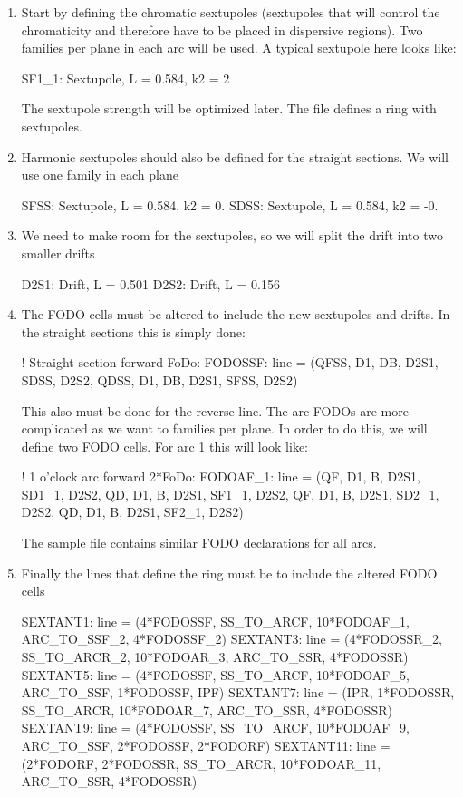 \documentclass{hitec}     %
\begin{document}
{{{{\begin{enumerate}[leftmargin=*]
%
\item Start by defining the chromatic sextupoles (sextupoles that will control the chromaticity and therefore have to be placed in dispersive regions). 
Two families per plane in each arc will be used. A typical sextupole here looks like:
\begin{code}
SF1_1: Sextupole, L = 0.584, k2 = 2
\end{code}
The sextupole strength will be optimized later. The  file defines a ring with sextupoles.
\item Harmonic sextupoles should also be defined for the straight sections. We will use one family in each plane
\begin{code}
SFSS: Sextupole, L = 0.584, k2 = 0.
SDSS: Sextupole, L = 0.584, k2 = -0.   
\end{code}
\item We need to make room for the sextupoles, so we will split the drift  into two smaller drifts
\begin{code}
D2S1: Drift, L = 0.501
D2S2: Drift, L = 0.156
\end{code}
\item The FODO cells must be altered to include the new sextupoles and drifts. In the straight sections this is simply done:
\begin{code}
! Straight section forward FoDo:
FODOSSF: line = (QFSS, D1, DB, D2S1, SDSS, D2S2, 
                 QDSS, D1, DB, D2S1, SFSS, D2S2)
\end{code}
This also must be done for the reverse line.
The arc FODOs are more  complicated as we want to families per plane. In order to do this, we will define two FODO cells. For arc 1 this will look like:
\begin{code}
! 1 o'clock arc forward 2*FoDo:
FODOAF_1: line = (QF, D1, B, D2S1, SD1_1, D2S2, 
                  QD, D1, B, D2S1, SF1_1, D2S2,
                  QF, D1, B, D2S1, SD2_1, D2S2, 
                  QD, D1, B, D2S1, SF2_1, D2S2)

\end{code}
The sample file contains similar FODO declarations for all arcs.
\item Finally the lines that define the ring must be to include the altered FODO cells
\begin{code}
SEXTANT1:  line = (4*FODOSSF, SS_TO_ARCF, 
                   10*FODOAF_1, ARC_TO_SSF_2, 4*FODOSSF_2)
SEXTANT3:  line = (4*FODOSSR_2, SS_TO_ARCR_2, 
                   10*FODOAR_3, ARC_TO_SSR, 4*FODOSSR)
SEXTANT5:  line = (4*FODOSSF, SS_TO_ARCF, 
                   10*FODOAF_5, ARC_TO_SSF, 1*FODOSSF, IPF)
SEXTANT7:  line = (IPR, 1*FODOSSR, SS_TO_ARCR, 
                   10*FODOAR_7, ARC_TO_SSR, 4*FODOSSR)
SEXTANT9:  line = (4*FODOSSF, SS_TO_ARCF, 
                   10*FODOAF_9, ARC_TO_SSF, 2*FODOSSF, 2*FODORF)
SEXTANT11: line = (2*FODORF, 2*FODOSSR, SS_TO_ARCR, 
                   10*FODOAR_11, ARC_TO_SSR, 4*FODOSSR)
\end{code}
\end{enumerate}

}}}}
\end{document}
